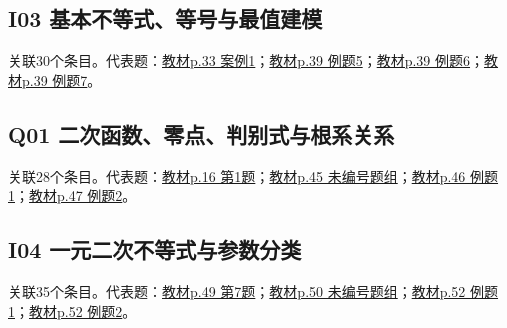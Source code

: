 \par\medskip\noindent\begin{minipage}{\linewidth}\subsection{I03 基本不等式、等号与最值建模}关联30个条目。代表题：\hyperref[XJ-B1-C02-CA-P033-Y0234]{教材p.33 案例1}；\hyperref[XJ-B1-C02-EX-P039-Y0303]{教材p.39 例题5}；\hyperref[XJ-B1-C02-EX-P039-Y0870]{教材p.39 例题6}；\hyperref[XJ-B1-C02-EX-P039-Y1344]{教材p.39 例题7}。\end{minipage}\par
\par\medskip\noindent\begin{minipage}{\linewidth}\subsection{Q01 二次函数、零点、判别式与根系关系}关联28个条目。代表题：\hyperref[XJ-B1-C01-PR-P016-Y0217]{教材p.16 第1题}；\hyperref[XJ-B1-C02-TH-P045-Y0479]{教材p.45 未编号题组}；\hyperref[XJ-B1-C02-EX-P046-Y1243]{教材p.46 例题1}；\hyperref[XJ-B1-C02-EX-P047-Y0578]{教材p.47 例题2}。\end{minipage}\par
\par\medskip\noindent\begin{minipage}{\linewidth}\subsection{I04 一元二次不等式与参数分类}关联35个条目。代表题：\hyperref[XJ-B1-C02-HW-P049-Y1284]{教材p.49 第7题}；\hyperref[XJ-B1-C02-TH-P050-Y1033]{教材p.50 未编号题组}；\hyperref[XJ-B1-C02-EX-P052-Y0592]{教材p.52 例题1}；\hyperref[XJ-B1-C02-EX-P052-Y1407]{教材p.52 例题2}。\end{minipage}\par

